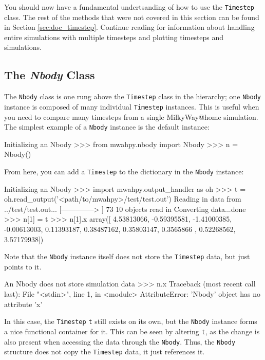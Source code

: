 \documentclass{article}
\begin{document}
You should now have a fundamental undertsanding of how to use the \verb!Timestep! class. The rest of the methods that were not covered in this section can be found in Section \ref{sec:doc_timestep}. Continue reading for information about handling entire simulations with multiple timesteps and plotting timesteps and simulations. 

\subsection{The \textit{Nbody} Class}

The \verb!Nbody! class is one rung above the \verb!Timestep! class in the \mwahpy hierarchy; one \verb!Nbody! instance is composed of many individual \verb!Timestep! instances. This is useful when you need to compare many timesteps from a single MilkyWay@home simulation. The simplest example of a \verb!Nbody! instance is the default instance:\\

\begin{codelisting}{Initializing an Nbody}
>>> from mwahpy.nbody import Nbody
>>> n = Nbody()
\end{codelisting}

From here, you can add a \verb!Timestep! to the dictionary in the \verb!Nbody! instance:\\

\begin{codelisting}{Initializing an Nbody}
>>> import mwahpy.output_handler as oh
>>> t = oh.read_output('<path/to/mwahpy>/test/test.out')
Reading in data from ../test/test.out...
[-------------->     ] 73%
10 objects read in
Converting data...done
>>> n[1] = t
>>> n[1].x
array([ 4.53813066, -0.59395581, -1.41000385, -0.00613003,  0.11393187,
        0.38487162,  0.35803147,  0.3565866 ,  0.52268562,  3.57179938])
\end{codelisting}

Note that the \verb!Nbody! instance itself does not store the \verb!Timestep! data, but just points to it. \\

\begin{codelisting}{An Nbody does not store simulation data}
>>> n.x
Traceback (most recent call last):
  File "<stdin>", line 1, in <module>
AttributeError: 'Nbody' object has no attribute 'x'
\end{codelisting}

In this case, the \verb!Timestep! \verb!t! still exists on its own, but the \verb!Nbody! instance forms a nice functional container for it. This can be seen by altering \verb!t!, as the change is also present when accessing the data through the \verb!Nbody!. Thus, the \verb!Nbody! structure does not copy the \verb!Timestep! data, it just references it. \\
\end{document}
